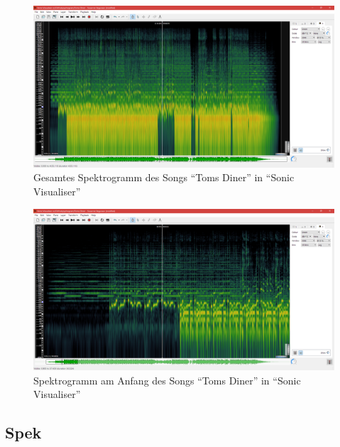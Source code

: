 \documentclass[a4paper]{article}
\begin{document}
\noindent
\begin{figure}[H]
    \centering
    \begin{minipage}{1.0\textwidth}
        \centering
        \includegraphics[width=1.0\textwidth]{Sonic_Toms_Diner_Spectrogram_all.png}
        \caption{Gesamtes Spektrogramm des Songs "`Toms Diner"' in "`Sonic Visualiser"'}
    \end{minipage}
\end{figure}
\begin{figure}[H]
    \centering
    \begin{minipage}{1.0\textwidth}
        \centering
        \includegraphics[width=1.0\textwidth]{Sonic_Toms_Diner_Spectrogram_close.png}
        \caption{Spektrogramm am Anfang des Songs "`Toms Diner"' in "`Sonic Visualiser"'}
    \end{minipage}
\end{figure}
\newpage
\subsection{Spek}
\end{document}

